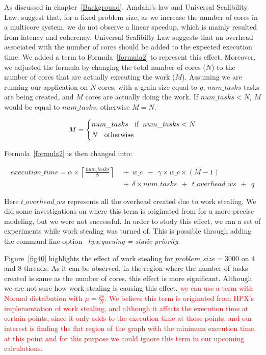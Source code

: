 As discussed in chapter~\ref{Background}, Amdahl's law and Universal Scalibility Law, suggest that, for a fixed problem size, as we increase the number of cores in a multicore system, we do not observe a linear speedup, which is mainly resulted from latency and coherency.
Universal Scalibilty Law\cite{gunther2007guerrilla} suggests that an overhead associated with the number of cores should be added to the expected execution time. We added a term to Formula~\ref{formula2} to represent this effect. Moreover, we adjusted the formula by changing the total number of cores ($N$) to the number of cores that are actually executing the work ($M$). 
Assuming we are running our application on $N$ cores, with a grain size equal to $g$, $num\_{tasks}$ tasks are being created, and $M$ cores are actually doing the work. If $num\_{tasks}<N$, $M$ would be equal to $num\_{tasks}$, otherwise $M=N$.

\begin{equation}\label{formula19}
M=\left\{
\begin{aligned}
&num\_{tasks} \text{\:\:\:\:if \:} num\_{tasks}<N\\
&N \text{\:\:\:\:otherwise}
\end{aligned}
\right.
\end{equation}


Formula~\ref{formula2} is then changed into:

\begin{equation}\label{formula1}
\begin{aligned}
execution\_time = 
\alpha\times{\left\lceil{\frac{num\_{tasks}}{N}}\right\rceil}\:\:&+\:\:w\_c\:\:+\:\:\gamma\times{w\_c}\times{(M-1)}\:\:\\
&+\:\:\delta\times{num\_{tasks}}\:\:+\:\:t\_{overhead\_{ws}}\:\:+\:\:q
\end{aligned}
\end{equation}

Here $t\_{overhead\_{ws}}$ represents all the overhead created due to work stealing. We did some investigations on where this term is originated from for a more precise modeling, but we were not successful. In order to study this effect, we ran a set of experiments while work stealing was turned of. This is possible through adding the command line option \emph{--hpx:queuing = static-priority}.

Figure~\ref{fig40} highlights the effect of work stealing for $problem\_size=3000$ on 4 and 8 threads. As it can be observed, in the region where the number of tasks created is same as the number of cores, this effect is more significant. Although we are not sure how work stealing is causing this effect, \textcolor{red}{we can use a term with Normal distribution with $\mu=\frac{ps}{N}$. We believe this term is originated from HPX's implementation of work stealing, and although it affects the execution time at certain points, since it only adds to the execution time at those points, and our interest is finding the flat region of the graph with the minimum execution time, at this point and for this purpose we could ignore this term in our upcoming calculations.}  


